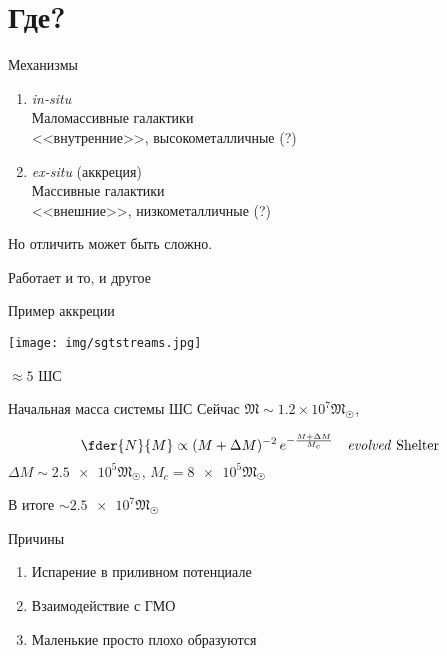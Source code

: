 \documentclass{beamer}
\def\solmass{\mathfrak{M}_{\astrosun}}
\begin{document}
\section{Где?}
\begin{frame}[wide]{Механизмы\cite{royalproc}}
    
\begin{enumerate}
    \item \emph{in-situ} \\
        Маломассивные галактики\\
        <<внутренние>>, 
        высокометалличные (?)
    \item \emph{ex-situ} (аккреция)\\
        Массивные галактики \\
        <<внешние>>, 
        низкометалличные (?)
\end{enumerate}
Но отличить может быть сложно.

Работает и то, и другое
\end{frame}

\begin{frame}{Пример аккреции}

    \texttt{[image: img/sgtstreams.jpg]}

    $\approx 5$ ШС\cite{royalproc}
\end{frame}

\begin{frame}{Начальная масса системы ШС}
Сейчас $\mathfrak{M} \sim 1.2 \times 10^7 \solmass$, 

\[
\fder{N}{M} \propto (M + \Delta M) ^{-2} \, e^{-\frac{M +\Delta M}{M_c}}
\quad \text{\emph{evolved} Shelter}
\]
$\Delta M \sim \num{2.5e5} \solmass$, 
$M_c = \num{8e5}\solmass$

\vspace{1em}

\begin{block}{В итоге}
    $\sim \num{2.5e7}\solmass{}$
\end{block}

\begin{block}{Причины}
\begin{enumerate}
    \item Испарение в приливном потенциале
    \item Взаимодействие с ГМО
    \item Маленькие просто плохо образуются
\end{enumerate}
\end{block}

\end{frame}
\end{document}
